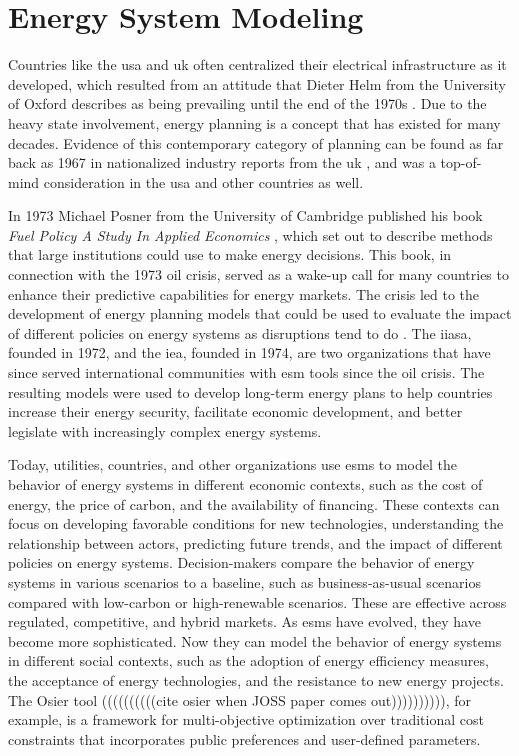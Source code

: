 \section{Energy System Modeling}
\label{sec:esm}

Countries like the \gls{usa} and \gls{uk} often centralized their electrical
infrastructure as it developed, which resulted from an attitude that Dieter
Helm from the University of Oxford describes as being prevailing until the end
of the 1970s \cite{helm_energy_2002}. Due to the heavy state involvement,
energy planning is a concept that has existed for many decades. Evidence of
this contemporary category of planning can be found as far back as 1967 in
nationalized industry reports from the \gls{uk}
\cite{treasury_nationalised_1967}, and was a top-of-mind consideration in the
\gls{usa} and other countries as well.

In 1973 Michael Posner from the University of Cambridge published his book
\textit{Fuel Policy A Study In Applied Economics} \cite{posner_fuel_1973},
which set out to describe methods that large institutions could use to make
energy decisions. This book, in connection with the 1973 oil crisis, served as
a wake-up call for many countries to enhance their predictive capabilities for
energy markets. The crisis led to the development of energy planning models
that could be used to evaluate the impact of different policies on energy
systems as disruptions tend to do \cite{plazas_disrupt_2022}. The \gls{iiasa},
founded in 1972, and the \gls{iea}, founded in 1974, are two organizations that
have since served international communities with \gls{esm} tools since the oil
crisis. The resulting models were used to develop long-term energy plans to
help countries increase their energy security, facilitate economic development,
and better legislate with increasingly complex energy systems.

Today, utilities, countries, and other organizations use \glspl{esm} to model
the behavior of energy systems in different economic contexts, such as the cost
of energy, the price of carbon, and the availability of financing. These
contexts can focus on developing favorable conditions for new technologies,
understanding the relationship between actors, predicting future trends, and
the impact of different policies on energy systems. Decision-makers compare the
behavior of energy systems in various scenarios to a baseline, such as
business-as-usual scenarios compared with low-carbon or high-renewable
scenarios. These are effective across regulated, competitive, and hybrid
markets. As \glspl{esm} have evolved, they have become more sophisticated. Now
they can model the behavior of energy systems in different social contexts,
such as the adoption of energy efficiency measures, the acceptance of energy
technologies, and the resistance to new energy projects. The Osier tool
((((((((((cite osier when JOSS paper comes out)))))))))), for example, is a
framework for multi-objective optimization over traditional cost constraints
that incorporates public preferences and user-defined parameters.

